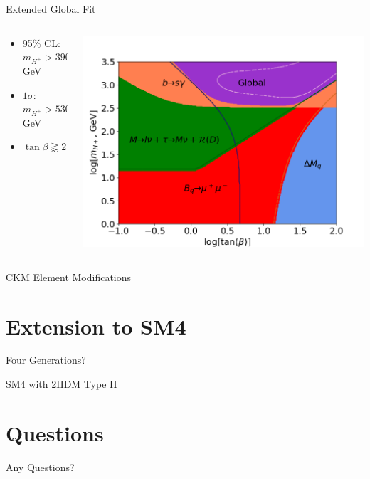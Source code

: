 \documentclass[10pt,xcolor={table,dvipsnames},t]{beamer}
\begin{document}
\begin{frame}{Extended Global Fit}
    \begin{columns}[T]
        \begin{column}{0.37\textwidth}
            \vspace{1.5em}
            \begin{itemize}
                \item 95\% CL: $m_{H^+}>390\,$GeV
                \item $1\sigma$: $m_{H^+}>530\,$GeV
                \item $\tan\beta\gtrapprox2$
            \end{itemize}
        \end{column}
        \begin{column}{0.60\textwidth}
            \includegraphics[scale=0.35]{global_lines.png}
        \end{column}
    \end{columns}
\end{frame}

\begin{frame}{CKM Element Modifications}

\end{frame}

\section{Extension to SM4}
\begin{frame}{Four Generations?}

\end{frame}

\begin{frame}{SM4 with 2HDM Type II}

\end{frame}

\section{Questions}
\begin{frame}
    \begin{center}
        \vspace{60pt}
        \Huge Any Questions?
    \end{center}
\end{frame}
\end{document}
